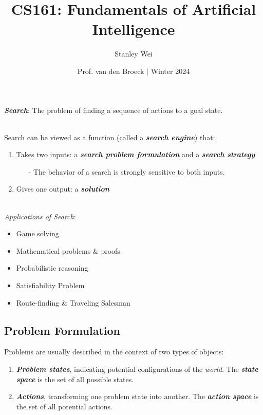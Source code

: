 \documentclass[12pt]{extarticle}
\title{CS161: Fundamentals of Artificial Intelligence}
\author{Stanley Wei}
\date{Prof. van den Broeck $\vert$ Winter 2024}
\theoremstyle{definition}
\theoremstyle{remark}
\newcommand{\pstart}[0]{\noindent}
\newcommand{\newp}[0]{~\\ \pstart}
\newcommand{\term}[1]{\noindent\textbf{\textit{#1}}}
\begin{document}
\pstart
\term{Search}: The problem of finding a sequence of actions to a goal state.

\newp
Search can be viewed as a function (called a \term{search engine}) that:
\begin{enumerate}
    \item Takes two inputs: a \term{search problem formulation} and a \term{search strategy} \begin{itemize}
        \item[-] The behavior of a search is strongly sensitive to both inputs.
    \end{itemize}
    \item Gives one output: a \term{solution}
\end{enumerate}

\newp
\textit{Applications of Search}: \begin{itemize}
    \item Game solving
    \item Mathematical problems \& proofs
    \item Probabilistic reasoning
    \item Satisfiability Problem
    \item Route-finding \& Traveling Salesman
\end{itemize}

\subsection{Problem Formulation}
\pstart
Problems are usually described in the context of two types of objects: \begin{enumerate}
    \item \term{Problem states}, indicating potential configurations of the \textit{world}. The \term{state space} is the set of all possible states.
    \item \term{Actions}, transforming one problem state into another. The \term{action space} is the set of all potential actions.
\end{enumerate}
\end{document}
